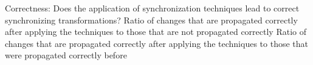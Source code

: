{Correctness: Does the application of synchronization techniques lead to correct synchronizing transformations?}
{Ratio of changes that are propagated correctly after applying the techniques to those that are not propagated correctly}
{Ratio of changes that are propagated correctly after applying the techniques to those that were propagated correctly before}




